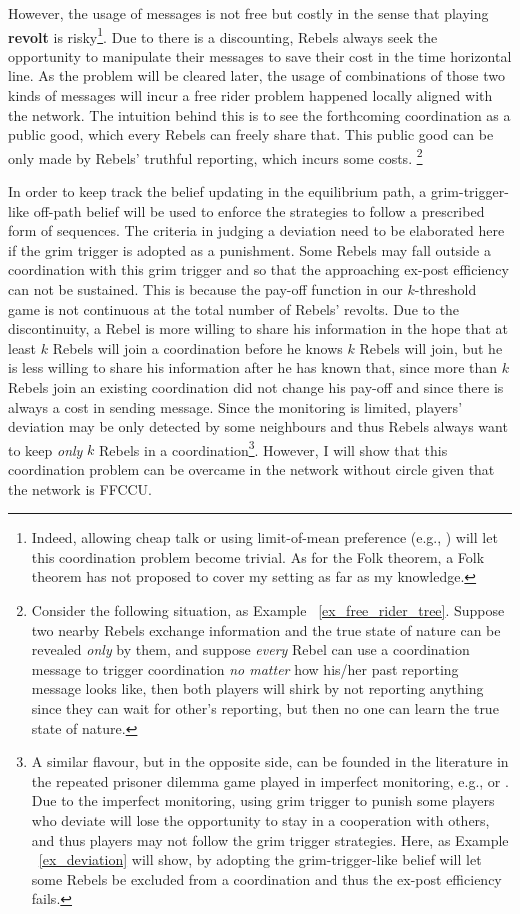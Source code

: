 \documentclass[12pt,letter]{article}
\theoremstyle{definition}
\theoremstyle{remark}
\theoremstyle{claim}
\begin{document}
However, the usage of messages is not free but costly in the sense that playing \textbf{revolt} is risky\footnote{Indeed, allowing cheap talk or using limit-of-mean preference (e.g., \citep{Renault1998}) will let this coordination problem become trivial. As for the Folk theorem, a Folk theorem has not proposed to cover my setting as far as my knowledge. }. Due to there is a discounting, Rebels always seek the opportunity to manipulate their messages to save their cost in the time horizontal line. As the problem will be cleared later, the usage of combinations of those two kinds of messages will incur a free rider problem happened locally aligned with the network. The intuition behind this is to see the forthcoming coordination as a public good, which every Rebels can freely share that. This public good can be only made by Rebels' truthful reporting, which incurs some costs. \footnote{Consider the following situation, as Example ~\ref{ex_free_rider_tree}. Suppose two nearby Rebels exchange information and the true state of nature can be revealed \textit{only} by them, and suppose \textit{every} Rebel can use a coordination message to trigger coordination \textit{no matter} how his/her past reporting message looks like, then both players will shirk by not reporting anything since they can wait for other's reporting, but then no one can learn the true state of nature.}

In order to keep track the belief updating in the equilibrium path, a grim-trigger-like off-path belief will be used to enforce the strategies to follow a prescribed form of sequences. The criteria in judging a deviation need to be elaborated here if the grim trigger is adopted as a punishment. Some Rebels may fall outside a coordination with this grim trigger and so that the approaching ex-post efficiency can not be sustained. This is because the pay-off function in our $k$-threshold game is not continuous at the total number of Rebels' revolts. Due to the discontinuity, a Rebel is more willing to share his information in the hope that at least $k$ Rebels will join a coordination before he knows $k$ Rebels will join, but he is less willing to share his information after he has known that, since more than $k$ Rebels join an existing coordination did not change his pay-off and since there is always a cost in sending message. Since the monitoring is limited, players' deviation may be only detected by some neighbours and thus Rebels always want to keep \textit{only} $k$ Rebels in a coordination\footnote{A similar flavour, but in the opposite side, can be founded in the literature in the repeated prisoner dilemma game played in imperfect monitoring, e.g., \citep{Ellison1994} or \citep{Wolitzky2013}. Due to the imperfect monitoring, using grim trigger to punish some players who deviate will lose the opportunity to stay in a cooperation with others, and thus players may not follow the grim trigger strategies. Here, as Example ~\ref{ex_deviation} will show, by adopting the grim-trigger-like belief will let some Rebels be excluded from a coordination and thus the ex-post efficiency fails.}. However, I will show that this coordination problem can be overcame in the network without circle given that the network is FFCCU.
\end{document}
